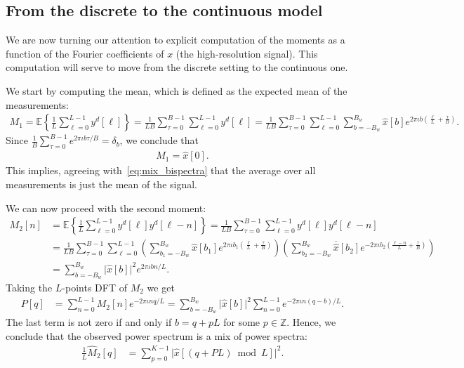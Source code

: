 \documentclass[english,12pt]{article}
\newcommand{\I}{\iota}
\newcommand{\tB}{B_w}
\newcommand{\hx}{\hat{x}}
\newcommand{\E}{\mathbb{E}}
\numberwithin{equation}{section}
\numberwithin{thm}{section} %
\begin{document}
\subsection{From the discrete to the continuous model} \label{sec:expressions}

We are now turning our attention to explicit computation of the moments as a function of the Fourier coefficients of $x$ (the high-resolution signal). This computation will serve to move from the discrete setting to the continuous one. 

We start by computing the mean, which is defined as the expected mean of the measurements: 
\begin{equation}
\begin{split}
M_1 = \E\left\{ \frac{1}{L} \sum_{\ell=0}^{L-1} y^d[\ell]\right\} =  \frac{1}{LB}\sum_{\tau=0}^{B-1}\sum_{\ell=0}^{L-1} y^d[\ell] =  \frac{1}{LB}\sum_{\tau=0}^{B-1}\sum_{\ell=0}^{L-1}
\sum_{b=-\tB}^{\tB}\hat{x}[b]e^{2\pi\I b \left(\frac{\ell}{L} + \frac{\tau}{B}\right) }.
\end{split}
\end{equation}
Since $\frac{1}{B}\sum_{\tau=0}^{B-1}e^{2\pi\I b \tau/B}=\delta_b$, we conclude that 
\begin{equation} \label{eq:mean}
\begin{split}
M_1 = \hx[0].
\end{split}
\end{equation}
This  implies, agreeing with~\eqref{eq:mix_bispectra} that the average over all measurements is just the mean of the signal.  

We can now proceed with the second moment:
\begin{equation} \label{eq:ps}
\begin{split}
M_2[n] &= \E\left\{\frac{1}{L}\sum_{\ell=0}^{L-1} y^d[\ell]y^d[\ell-n]\right\} =  \frac{1}{LB}\sum_{\tau=0}^{B-1}\sum_{\ell=0}^{L-1} y^d[\ell]y^d[\ell-n] \\ &=  \frac{1}{LB}\sum_{\tau=0}^{B-1}\sum_{\ell=0}^{L-1}
\left(\sum_{b_1=-\tB}^{\tB}\hat{x}[b_1]e^{2\pi\I b_1 \left(\frac{\ell}{L} + \frac{\tau}{B}\right)} \right)
\left(\sum_{b_2=-\tB}^{\tB}\overline{\hx}[b_2]e^{-2\pi\I b_2 \left(\frac{\ell-n}{L} + \frac{\tau}{B}\right)} \right) \\
&=
\sum_{b=-\tB}^{\tB}\vert \hat{x}[b]\vert ^2e^{2\pi\I bn/L}.
\end{split}
\end{equation}
Taking the $L$-points DFT of $M_2$ we get 
\begin{equation}
\begin{split}
P[q] &= \sum_{n=0}^{L-1}M_2[n]e^{-2\pi\I nq/L} = \sum_{b=-\tB}^{\tB}\vert \hat{x}[b]\vert^2\sum_{n=0}^{L-1}e^{-2\pi\I n(q-b)/L}.
\end{split}
\end{equation}
The last term is not zero if and only if $b = q + pL$ for some $p\in\mathbb{Z}$.  Hence, we conclude that the observed power spectrum is a mix of power spectra:
\begin{equation}
\begin{split}
\frac{1}{L}\hat{M}_2[q] &=  \sum_{p=0}^{K-1} \vert \hat{x}[(q+PL)\bmod L]\vert^2.
\end{split}
\end{equation}
\end{document}
